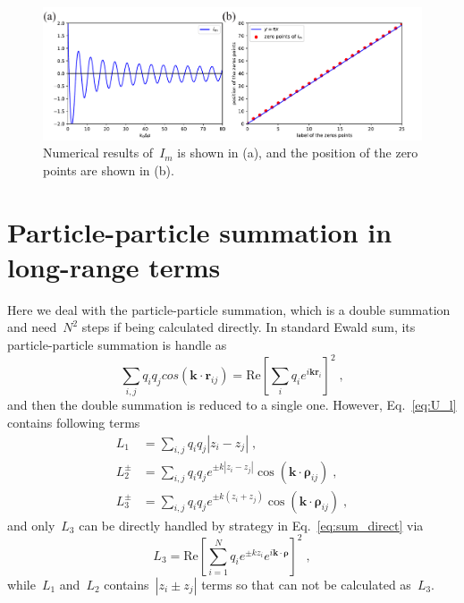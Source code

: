 \documentclass[aps,prl,reprint,showpacs,floatfix,superscriptaddress, onecolumn]{revtex4-2}
\newcommand{\V}[1]{\boldsymbol{#1}} %
\newcommand{\abs}[1]{\left|#1\right|} %
\begin{document}
\begin{figure}[htbp]
\centering
\includegraphics[width=  \linewidth]{SIfig/I_3.pdf}
\caption{
    Numerical results of~$I_{m}$ is shown in (a), and the position of the zero points are shown in (b).
}
\label{fig:I_3}
\end{figure}

\section{Particle-particle summation in long-range terms}

Here we deal with the particle-particle summation, which is a double summation and need~$N^2$ steps if being calculated directly.
In standard Ewald sum, its particle-particle summation is handle as
\begin{equation}\label{eq:sum_direct}
    \sum_{i, j} q_i q_j cos(\V{k} \cdot \V{r}_{ij}) = \text{Re} \left[ \sum_i q_i e^{i \V{k} \V{r}_i} \right]^2\;,
\end{equation}
and then the double summation is reduced to a single one.
However, Eq.~\eqref{eq:U_l} contains following terms
\begin{equation}\label{eq:L}
\begin{split}
    L_1 &= \sum_{i, j} q_i q_j \abs{z_i - z_j}\;,\\
    L_2^{\pm} &= \sum_{i, j} q_i q_j e^{\pm k\abs{z_i - z_j}} \cos{(\V{k} \cdot \V{\rho}_{ij})}\;,\\
    L_3^{\pm} &= \sum_{i, j} q_i q_j e^{\pm k(z_i + z_j)} \cos{(\V{k} \cdot \V{\rho}_{ij})}\;,
\end{split}
\end{equation}
and only~$L_3$ can be directly handled by strategy in Eq.~\eqref{eq:sum_direct} via
\begin{equation}
    L_3 = \text{Re} \left[ \sum_{i = 1}^N q_i e^{\pm k z_i} e^{i \V{k} \cdot \V{\rho}} \right]^2\;,
\end{equation}
while~$L_1$ and~$L_2$ contains~$\abs{z_i \pm z_j}$ terms so that can not be calculated as~$L_3$.
\end{document}
